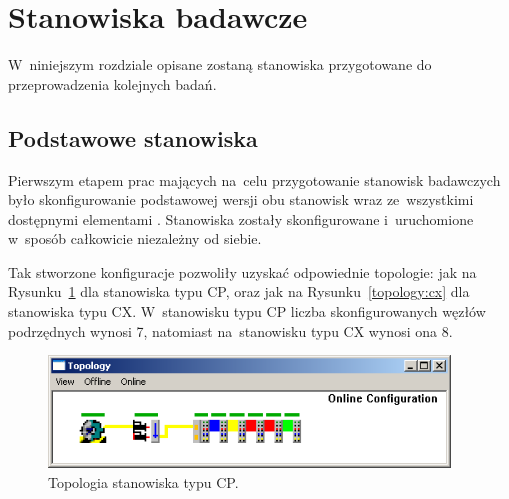 \section{Stanowiska badawcze}
W~niniejszym rozdziale opisane zostaną stanowiska przygotowane do przeprowadzenia kolejnych badań.

\subsection{Podstawowe stanowiska}
Pierwszym etapem prac mających na~celu przygotowanie stanowisk badawczych było skonfigurowanie podstawowej wersji obu stanowisk wraz ze~wszystkimi dostępnymi elementami \cite{kurs2}. Stanowiska zostały skonfigurowane i~uruchomione w~sposób całkowicie niezależny od siebie.

Tak stworzone konfiguracje pozwoliły uzyskać odpowiednie topologie: jak na Rysunku~\ref{topology:cp} dla stanowiska typu CP, oraz jak na Rysunku~\ref{topology:cx} dla stanowiska typu CX. W~stanowisku typu CP liczba skonfigurowanych węzłów podrzędnych wynosi 7, natomiast na~stanowisku typu CX wynosi ona 8.
\begin{figure}[!htb] 	\centering 	\includegraphics[width=0.95\textwidth]{images/topologyCP} \caption{Topologia stanowiska typu CP.} \label{topology:cp} \end{figure}

